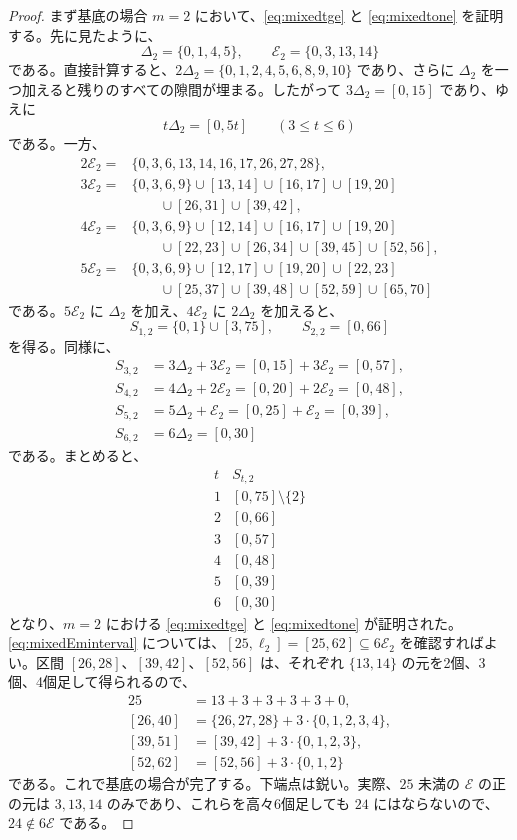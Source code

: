 \documentclass[12pt]{ltjsarticle}
\theoremstyle{plain}
\theoremstyle{definition}
\theoremstyle{plain}
\begin{document}
\begin{proof}
まず基底の場合 $m=2$ において、\eqref{eq:mixedtge} と \eqref{eq:mixedtone} を証明する。先に見たように、
\[
 \Delta_2=\{0,1,4,5\},\qquad \mathcal E_2=\{0,3,13,14\}
\]
である。直接計算すると、$2\Delta_2=\{0,1,2,4,5,6,8,9,10\}$ であり、さらに $\Delta_2$ を一つ加えると残りのすべての隙間が埋まる。したがって $3\Delta_2=[0,15]$ であり、ゆえに
\[
 t\Delta_2=[0,5t]\qquad(3\leq t\leq6)
\]
である。一方、
\[
\begin{aligned}
2\mathcal E_2
={}&\{0,3,6,13,14,16,17,26,27,28\},\\[1ex]
3\mathcal E_2
={}&\{0,3,6,9\}\cup[13,14]\cup[16,17]\cup[19,20]\\
&\qquad\cup[26,31]\cup[39,42],\\[1ex]
4\mathcal E_2
={}&\{0,3,6,9\}\cup[12,14]\cup[16,17]\cup[19,20]\\
&\qquad\cup[22,23]\cup[26,34]\cup[39,45]\cup[52,56],\\[1ex]
5\mathcal E_2
={}&\{0,3,6,9\}\cup[12,17]\cup[19,20]\cup[22,23]\\
&\qquad\cup[25,37]\cup[39,48]\cup[52,59]\cup[65,70]
\end{aligned}
\]
である。$5\mathcal E_2$ に $\Delta_2$ を加え、$4\mathcal E_2$ に $2\Delta_2$ を加えると、
\[
 S_{1,2}=\{0,1\}\cup[3,75],\qquad S_{2,2}=[0,66]
\]
を得る。同様に、
\[
\begin{aligned}
S_{3,2}&=3\Delta_2+3\mathcal E_2=[0,15]+3\mathcal E_2=[0,57],\\[1ex]
S_{4,2}&=4\Delta_2+2\mathcal E_2=[0,20]+2\mathcal E_2=[0,48],\\[1ex]
S_{5,2}&=5\Delta_2+\mathcal E_2=[0,25]+\mathcal E_2=[0,39],\\[1ex]
S_{6,2}&=6\Delta_2=[0,30]
\end{aligned}
\]
である。まとめると、
\[
\begin{array}{c|c}
t&S_{t,2}\\ \hline
1&[0,75]\setminus\{2\}\\
2&[0,66]\\
3&[0,57]\\
4&[0,48]\\
5&[0,39]\\
6&[0,30]
\end{array}
\]
となり、$m=2$ における \eqref{eq:mixedtge} と \eqref{eq:mixedtone} が証明された。\eqref{eq:mixedEminterval} については、$[25,\ell_2]=[25,62]\subseteq6\mathcal E_2$ を確認すればよい。区間 $[26,28]$、$[39,42]$、$[52,56]$ は、それぞれ $\{13,14\}$ の元を2個、3個、4個足して得られるので、
\[
\begin{aligned}
25&=13+3+3+3+3+0,\\
[26,40]&=\{26,27,28\}+3\cdot\{0,1,2,3,4\},\\
[39,51]&=[39,42]+3\cdot\{0,1,2,3\},\\
[52,62]&=[52,56]+3\cdot\{0,1,2\}
\end{aligned}
\]
である。これで基底の場合が完了する。下端点は鋭い。実際、$25$ 未満の $\mathcal E$ の正の元は $3,13,14$ のみであり、これらを高々6個足しても $24$ にはならないので、$24\notin6\mathcal E$ である。


\end{proof}
\end{document}
